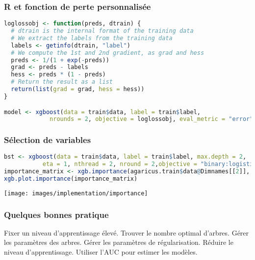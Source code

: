 \begin{frame}[fragile]
	\frametitle{R et fonction de perte personnalisée}
	\begin{lstlisting}[language=R]
loglossobj <- function(preds, dtrain) {
  # dtrain is the internal format of the training data
  # We extract the labels from the training data
  labels <- getinfo(dtrain, "label")
  # We compute the 1st and 2nd gradient, as grad and hess
  preds <- 1/(1 + exp(-preds))
  grad <- preds - labels
  hess <- preds * (1 - preds)
  # Return the result as a list
  return(list(grad = grad, hess = hess))
}

model <- xgboost(data = train$data, label = train$label,
             nrounds = 2, objective = loglossobj, eval_metric = "error")\end{lstlisting}
\end{frame}

\begin{frame}[fragile]
	\frametitle{Sélection de variables}
	\begin{lstlisting}[language=R]
bst <- xgboost(data = train$data, label = train$label, max.depth = 2,
           eta = 1, nthread = 2, nround = 2,objective = "binary:logistic")
importance_matrix <- xgb.importance(agaricus.train$data@Dimnames[[2]], model = bst)
xgb.plot.importance(importance_matrix)\end{lstlisting}
	\begin{center}
		\texttt{[image: images/implementation/importance]}
	\end{center}
	\rule{0pt}{0pt}\hfill{\fontsize{.15cm}{0cm}}	
\end{frame}

\begin{frame}
	\frametitle{Quelques bonnes pratique}
	\begin{itemize}
		Fixer un niveau d'apprentissage élevé.\vspace*{.2cm}
		Trouver le nombre optimal d'arbres.\vspace*{.2cm}
		Gérer les paramètres des arbres.\vspace*{.2cm}
		Gérer les paramètres de régularisation.\vspace*{.2cm}
		Réduire le niveau d'apprentissage.\vspace*{.2cm}
		Utiliser l'AUC pour estimer les modèles.\vspace*{.2cm}
	\end{itemize}
\end{frame}